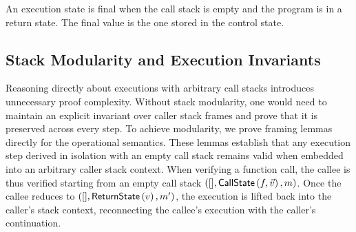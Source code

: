 \documentclass[report.tex]{subfiles}
\begin{document}
An execution state is final when the call stack is empty and the program is in
a return state.
The final value is the one stored in the control state.

\subsection{Stack Modularity and Execution Invariants}

Reasoning directly about executions with arbitrary call stacks introduces
unnecessary proof complexity.
Without stack modularity,
one would need to maintain an explicit invariant over caller stack frames and
prove that it is preserved across every step.
To achieve modularity,
we prove framing lemmas directly for the operational semantics.
These lemmas establish that any execution step derived
in isolation with an empty call stack remains valid when
embedded into an arbitrary caller stack context.
When verifying a function call,
the callee is thus verified starting from an empty call stack
$([], \textsf{CallState}\left(f, \vec{v}\right), m)$.
Once the callee reduces to $([], \textsf{ReturnState}\left(v\right), m')$,
the execution is lifted back into the caller's stack context,
reconnecting the callee's execution with the caller's continuation.
\end{document}
